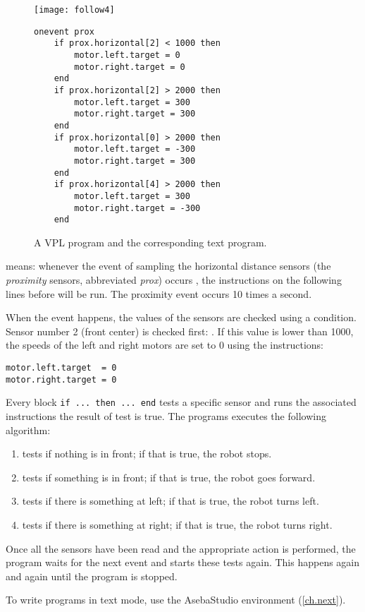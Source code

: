 \begin{figure}
\texttt{[image: follow4]}
\hfill
\begin{minipage}[b]{0.6\textwidth}
\footnotesize
\begin{lstlisting}
onevent prox
	if prox.horizontal[2] < 1000 then
		motor.left.target = 0
		motor.right.target = 0
	end
	if prox.horizontal[2] > 2000 then
		motor.left.target = 300
		motor.right.target = 300
	end
	if prox.horizontal[0] > 2000 then
		motor.left.target = -300
		motor.right.target = 300
	end
	if prox.horizontal[4] > 2000 then
		motor.left.target = 300
		motor.right.target = -300
	end
\end{lstlisting}
\end{minipage}
\caption{A VPL program and the corresponding text program.}
\label{fig.textcode}
\end{figure}

 means: whenever the event of sampling the horizontal
distance sensors (the \emph{proximity} sensors, abbreviated \emph{prox})
occurs , the instructions on the following lines before  will be
run. The proximity event occurs 10 times a second.

When the event happens, the values of the sensors are checked using a
condition. Sensor number 2 (front center) is checked first:
. If this value is lower than 1000, the speeds of
the left and right motors are set to 0 using the instructions:

\begin{verbatim}
motor.left.target  = 0
motor.right.target = 0
\end{verbatim}

Every block \verb+if ... then ... end+ tests a specific sensor and runs
the associated instructions the result of test is true. The programs
executes the following algorithm:

\begin{enumerate}[start=0,noitemsep,nosep]
\item tests if nothing is in front; if that is true, the robot stops.
\item tests if something is in front; if that is true, the robot goes forward.
\item tests if there is something at left; if that is true, the robot turns left.
\item tests if there is something at right; if that is true, the robot turns right.
\end{enumerate}

Once all the sensors have been read and the appropriate action is
performed, the program waits for the next event  and starts
these tests again. This happens again and again until the program is
stopped.

To write programs in text mode, use the AsebaStudio environment
(\cref{ch.next}).

\bigskip


